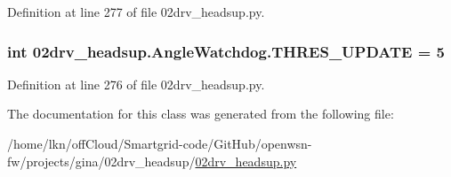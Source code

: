 Definition at line 277 of file 02drv\+\_\+headsup.\+py.

\subsubsection[{\texorpdfstring{T\+H\+R\+E\+S\+\_\+\+U\+P\+D\+A\+TE}{THRES_UPDATE}}]{\setlength{\rightskip}{0pt plus 5cm}int 02drv\+\_\+headsup.\+Angle\+Watchdog.\+T\+H\+R\+E\+S\+\_\+\+U\+P\+D\+A\+TE = 5\hspace{0.3cm}{\ttfamily [static]}}\hypertarget{class02drv__headsup_1_1_angle_watchdog_a0c36bfb45868e616a57d7402f4ad234c}{}\label{class02drv__headsup_1_1_angle_watchdog_a0c36bfb45868e616a57d7402f4ad234c}


Definition at line 276 of file 02drv\+\_\+headsup.\+py.



The documentation for this class was generated from the following file\+:\begin{DoxyCompactItemize}
\item 
/home/lkn/off\+Cloud/\+Smartgrid-\/code/\+Git\+Hub/openwsn-\/fw/projects/gina/02drv\+\_\+headsup/\hyperlink{02drv__headsup_8py}{02drv\+\_\+headsup.\+py}\end{DoxyCompactItemize}
